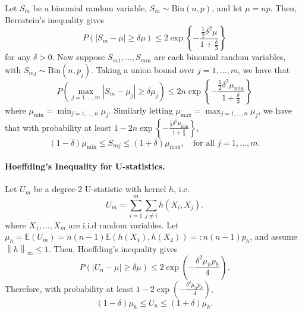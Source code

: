 \documentclass{article}
\newcommand{\norm}[1]{\left\lVert#1\right\rVert}
\newcommand{\abs}[1]{\left \lvert #1 \right \rvert}
\newcommand{\set}[1]{\left\{#1\right\}}
\newcommand{\1}{\mathbf{1}}
\theoremstyle{alden}
\theoremstyle{aldenthm}
\theoremstyle{remark}
\begin{document}
Let $S_m$ be a binomial random variable, $S_m \sim \textrm{Bin}(n,p)$, and let $\mu = np$.  Then, Bernstein's inequality gives
\begin{equation*}
P\left(\abs{S_m - \mu} \geq \delta \mu \right) \leq 2 \exp\set{- \frac{\frac{1}{2}\delta^2\mu}{1 + \frac{\delta}{3}}}
\end{equation*}
for any $\delta > 0$. Now suppose $S_{m1},\ldots,S_{mm}$ are each binomial random variables, with $S_{mj} \sim \textrm{Bin}(n,p_j)$. Taking a union bound over $j = 1,\ldots,m$, we have that
\begin{equation*}
P\left(\max_{j = 1,\ldots,m}\abs{S_m - \mu_j} \geq \delta \mu_j \right) \leq 2 n \exp\set{- \frac{\frac{1}{2}\delta^2\mu_{\min}}{1 + \frac{\delta}{3}}} 
\end{equation*}
where $\mu_{\min} = \min_{j = 1,\ldots,n} \mu_j$. Similarly letting $\mu_{\max} = \max_{j = 1,\ldots,n} \mu_j$, we have that with probability at least $1 - 2 n \exp\set{- \frac{\frac{1}{2}\delta^2\mu_{\min}}{1 + \frac{\delta}{3}}}$,
\begin{equation*}
(1 - \delta) \mu_{\min} \leq S_{mj} \leq (1 + \delta) \mu_{\max}, \quad \textrm{for all $j = 1,\ldots,m$.}
\end{equation*}

\paragraph{Hoeffding's Inequality for U-statistics.}
Let $U_m$ be a degree-2 U-statistic with kernel $h$, i.e.
\begin{equation*}
U_m = \sum_{i = 1}^{m} \sum_{j \neq i} h(X_i,X_j).
\end{equation*}
where $X_1,\ldots, X_m$ are i.i.d random variables. Let $\mu_h = \mathbb{E}(U_m) = n(n-1)\mathbb{E}(h(X_1),h(X_2)) =:n(n-1)p_h$, and assume $\norm{h}_{\infty} \leq 1$. Then, Hoeffding's inequality gives
\begin{equation*}
P(\abs{U_n - \mu} \geq \delta \mu) \leq 2 \exp\left(-\frac{\delta^2 \mu_h p_h}{4}\right).
\end{equation*}
Therefore, with probability at least $1 - 2 \exp\left(-\frac{\delta^2 \mu_h p_h}{4}\right)$,
\begin{equation*}
(1 - \delta) \mu_h \leq U_n \leq (1 + \delta) \mu_h.
\end{equation*}
\end{document}
